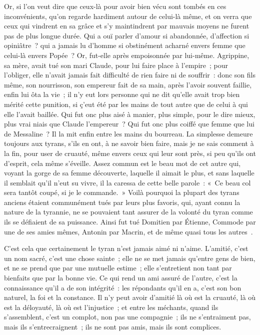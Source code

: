 \documentclass[french,twoside]{book} %
\begin{document}
Or, si l’on veut dire que ceux-là pour avoir bien vécu sont tombés en ces inconvénients, qu’on regarde hardiment autour de celui-là même, et on verra que ceux qui vindrent en sa grâce et s’y maintindrent par mauvais moyens ne furent pas de plus longue durée. Qui a ouï parler d’amour si abandonnée, d’affection si opiniâtre ? qui a jamais lu d’homme si obstinément acharné envers femme que celui-là envers Popée ? Or, fut-elle après empoisonnée par lui-même. Agrippine, sa mère, avait tué son mari Claude, pour lui faire place à l’empire ; pour l’obliger, elle n’avait jamais fait difficulté de rien faire ni de souffrir : donc son fils même, son nourrisson, son empereur fait de sa main, après l’avoir souvent faillie, enfin lui ôta la vie ; il n’y eut lors personne qui ne dit qu’elle avait trop bien mérité cette punition, si ç’eut été par les mains de tout autre que de celui à qui elle l’avait baillée. Qui fut onc plus aisé à manier, plus simple, pour le dire mieux, plus vrai niais que Claude l’empereur ? Qui fut onc plus coiffé que femme que lui de Messaline ? Il la mit enfin entre les mains du bourreau. La simplesse demeure toujours aux tyrans, s’ils en ont, à ne savoir bien faire, mais je ne sais comment à la fin, pour user de cruauté, même envers ceux qui leur sont près, si peu qu’ils ont d’esprit, cela même s’éveille. Assez commun est le beau mot de cet autre qui, voyant la gorge de sa femme découverte, laquelle il aimait le plus, et sans laquelle il semblait qu’il n’eut su vivre, il la caressa de cette belle parole : « Ce beau col sera tantôt coupé, si je le commande. » Voilà pourquoi la plupart des tyrans anciens étaient communément tués par leurs plus favoris, qui, ayant connu la nature de la tyrannie, ne se pouvaient tant assurer de la volonté du tyran comme ils se défiaient de sa puissance. Ainsi fut tué Domitien par Étienne, Commode par une de ses amies mêmes, Antonin par Macrin, et de même quasi tous les autres .\par
C’est cela que certainement le tyran n’est jamais aimé ni n’aime. L’amitié, c’est un nom sacré, c’est une chose sainte ; elle ne se met jamais qu’entre gens de bien, et ne se prend que par une mutuelle estime ; elle s’entretient non tant par bienfaits que par la bonne vie. Ce qui rend un ami assuré de l’autre, c’est la connaissance qu’il a de son intégrité : les répondants qu’il en a, c’est son bon naturel, la foi et la constance. Il n’y peut avoir d’amitié là où est la cruauté, là où est la déloyauté, là où est l’injustice ; et entre les méchants, quand ils s’assemblent, c’est un complot, non pas une compagnie ; ils ne s’entraiment pas, mais ils s’entrecraignent ; ils ne sont pas amis, mais ils sont complices.\par
\end{document}
